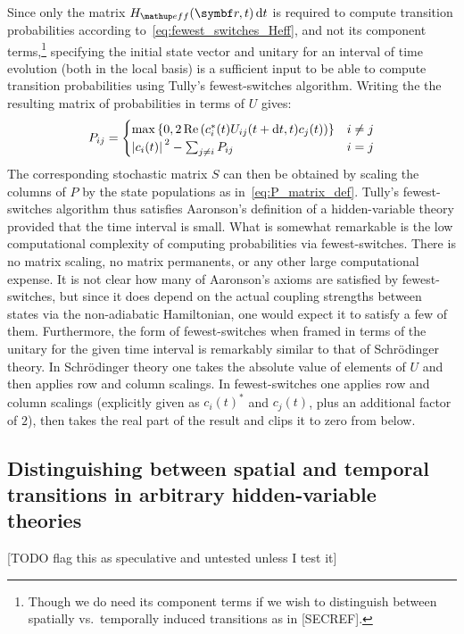 Since only the matrix $H_\up{eff}(\vec r, t)\,\dd t$ is required to compute transition probabilities according to~\eqref{eq:fewest_switches_Heff}, and not its component terms,\footnote{Though we do need its component terms if we wish to distinguish between spatially vs.\ temporally induced transitions as in [SECREF].} specifying the initial state vector and unitary for an interval of time evolution (both in the local basis) is a sufficient input to be able to compute transition probabilities using Tully's fewest-switches algorithm. Writing the the resulting matrix of probabilities in terms of $U$ gives:
\begin{align}
P_{ij} = \begin{cases}
\max\left\{0, 2\re\left(c_i^*(t)U_{ij}(t + \dd t, t)c_j(t)\right)\right\} & i \neq j\\
\abs{c_i(t)}^2 - \sum_{j\neq i} P_{ij} & i = j
\end{cases}
\end{align}
The corresponding stochastic matrix $S$ can then be obtained by scaling the columns of $P$ by the state populations as in~\eqref{eq:P_matrix_def}. Tully's fewest-switches algorithm thus satisfies Aaronson's definition of a hidden-variable theory provided that the time interval is small. What is somewhat remarkable is the low computational complexity of computing probabilities via fewest-switches. There is no matrix scaling, no matrix permanents, or any other large computational expense. It is not clear how many of Aaronson's axioms are satisfied by fewest-switches, but since it does depend on the actual coupling strengths between states via the non-adiabatic Hamiltonian, one would expect it to satisfy a few of them. Furthermore, the form of fewest-switches when framed in terms of the unitary for the given time interval is remarkably similar to that of Schr\"odinger theory. In Schr\"odinger theory one takes the absolute value of elements of $U$ and then applies row and column scalings. In fewest-switches one applies row and column scalings (explicitly given as $c_i(t)^*$ and $c_j(t)$, plus an additional factor of $2$), then takes the real part of the result and clips it to zero from below.

\subsection{Distinguishing between spatial and temporal transitions in arbitrary hidden-variable theories}

[TODO flag this as speculative and untested unless I test it]

